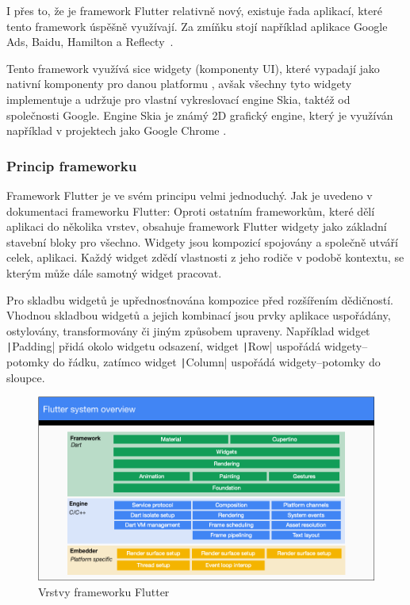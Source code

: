 I přes to,
že je framework Flutter relativně nový,
existuje řada aplikací,
které tento framework úspěšně využívají.
Za zmíňku stojí například aplikace Google Ads, Baidu, Hamilton a
Reflecty~\cite{flutter}.

Tento framework využívá sice widgety (komponenty UI),
které vypadají jako nativní komponenty pro danou platformu \cite{flutter},
avšak všechny tyto widgety implementuje a udržuje pro vlastní vykreslovací
engine Skia,
taktéž od společnosti Google.
Engine Skia je známý 2D grafický engine,
který je využíván například v projektech jako Google Chrome \cite{skia}.

\subsubsection*{Princip frameworku }

Framework Flutter je ve svém principu velmi jednoduchý.
Jak je uvedeno v dokumentaci frameworku Flutter:
 \cite{flutter_technical_overview}
Oproti ostatním frameworkům,
které dělí aplikaci do několika vrstev,
obsahuje framework Flutter widgety jako základní stavební bloky pro všechno.
Widgety jsou kompozicí spojovány a společně utváří celek, aplikaci.
Každý widget zdědí vlastnosti z jeho rodiče v podobě kontextu,
se kterým může dále samotný widget pracovat.
\cite{flutter_technical_overview}

Pro skladbu widgetů je upřednosťnována kompozice před rozšířením dědičností.
Vhodnou skladbou widgetů a jejich kombinací jsou prvky aplikace uspořádány,
ostylovány, transformovány či jiným způsobem upraveny.
Například widget \texttt|Padding| přidá okolo widgetu odsazení,
widget \texttt|Row| uspořádá widgety--potomky do řádku,
zatímco widget \texttt|Column| uspořádá widgety--potomky do sloupce.
\cite{flutter_technical_overview}

\begin{figure}[ht!]
    \centering
    \includegraphics[width=\linewidth]{assets/technology-research/framework/flutter_overview.png}
    \caption{Vrstvy frameworku Flutter  \cite{flutter_technical_overview}}
    \label{fig:flutter_layers}
\end{figure}

